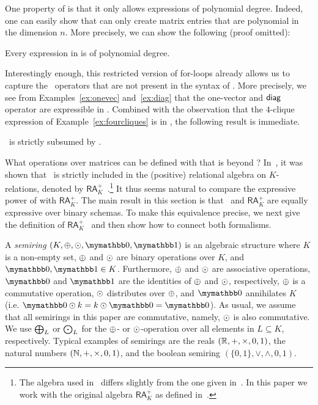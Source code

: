 One property of \langsum is that it only allows expressions of polynomial degree. Indeed, one can easily show that \langsum can only create matrix entries that are polynomial in the dimension $n$. More precisely, we can show the following (proof omitted):
\begin{proposition}\label{prop:poly}
Every expression in \langsum is of polynomial degree.
\end{proposition}


Interestingly enough, this restricted version of for-loops already allows us to capture the \lang\ operators that are not present in the syntax of \langsum. More precisely, we see from Examples~\ref{ex:onevec} and~\ref{ex:diag} that the one-vector and $\textsf{diag}$ operator are expressible in \langsum. Combined with the observation that the $4$-clique
expression of Example~\ref{ex:fourcliques} is in \langsum, the following result is immediate.

\begin{corollary}
\lang\ is strictly subsumed by \langsum.
\end{corollary}

What operations over matrices can be defined with \langsum that is beyond \lang? In~\cite{brijder2019matrices}, it was shown that \lang\ is strictly included in the (positive) relational algebra on $K$-relations, denoted by $\mathsf{RA}_{K}^+$~\cite{GreenKT07}.\footnote{The algebra used in~\cite{brijder2019matrices} differs slightly from the one given in~\cite{GreenKT07}. In this paper we work with the original algebra $\mathsf{RA}_{K}^+$ as defined in~\cite{GreenKT07}.} 
It thus seems natural to compare the expressive power of \langsum with $\mathsf{RA}_{K}^+$. 
The main result in this section is that \langsum\ and $\mathsf{RA}_{K}^+$ 
are equally expressive over binary schemas. 
To make this equivalence precise, we next give the 
definition of $\mathsf{RA}_{K}^+$~\cite{GreenKT07} and then show how to connect both formalisms.

A \textit{semiring} $(K, \ksum, \kprod, \kzero, \kone)$ is an algebraic structure where $K$ is a non-empty set, $\oplus$ and $\odot$ are binary operations over $K$, and $\kzero, \kone \in K$. Furthermore,  $\oplus$ and $\odot$ are associative operations, $\kzero$ and $\kone$ are the identities of $\oplus$ and $\odot$, respectively, $\oplus$ is a commutative operation, $\odot$ distributes over $\oplus$, and $\kzero$ annihilates $K$ (i.e. $\kzero \kprod k = k \kprod \kzero = \kzero$). As usual, we assume that all semirings in this paper are commutative, namely, $\odot$ is also commutative. We use $\bigoplus_L$ or $\bigodot_L$ for the $\oplus$- or $\odot$-operation over all elements in $L\subseteq K$, respectively. Typical examples of semirings are the reals $(\mathbb{R}, +, \times, 0,1)$, the natural numbers $(\mathbb{N}, +, \times, 0,1)$, and the boolean semiring $(\{0,1\}, \vee, \wedge, 0, 1)$. 

